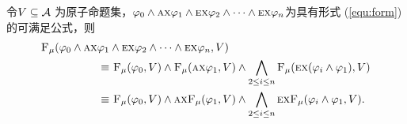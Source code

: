\begin{lemma}\label{lem:geneq}
	令$V\subseteq {\cal A}$ 为原子命题集，$\varphi_0 \wedge \textsc{a}\textsc{x} \varphi_1 \wedge \textsc{e}\textsc{x} \varphi_2 \wedge \dots \wedge \textsc{e} \textsc{x} \varphi_n$为具有形式 (\ref{equ:form})的可满足公式，则
	\begin{align*}
		{\textsc{F}_{\textsc{$\mu$}}}(\varphi_0 \wedge \textsc{a}\textsc{x} \varphi_1 & \wedge \textsc{e}\textsc{x} \varphi_2 \wedge \dots \wedge \textsc{e} \textsc{x} \varphi_n,V) \\
		\equiv &\ {\textsc{F}_{\textsc{$\mu$}}}(\varphi_0, V) \wedge {\textsc{F}_{\textsc{$\mu$}}}(\textsc{a}\textsc{x} \varphi_1, V) \wedge \bigwedge_{2\leq i\leq n}  {\textsc{F}_{\textsc{$\mu$}}}(\textsc{e}\textsc{x}(\varphi_i \wedge \varphi_1), V)\\
		\equiv &\  {\textsc{F}_{\textsc{$\mu$}}}(\varphi_0, V) \wedge \textsc{a}\textsc{x}{\textsc{F}_{\textsc{$\mu$}}}(\varphi_1, V) \wedge \bigwedge_{2\leq i\leq n} \textsc{e}\textsc{x} {\textsc{F}_{\textsc{$\mu$}}}(\varphi_i \wedge \varphi_1, V).
	\end{align*}
\end{lemma}
